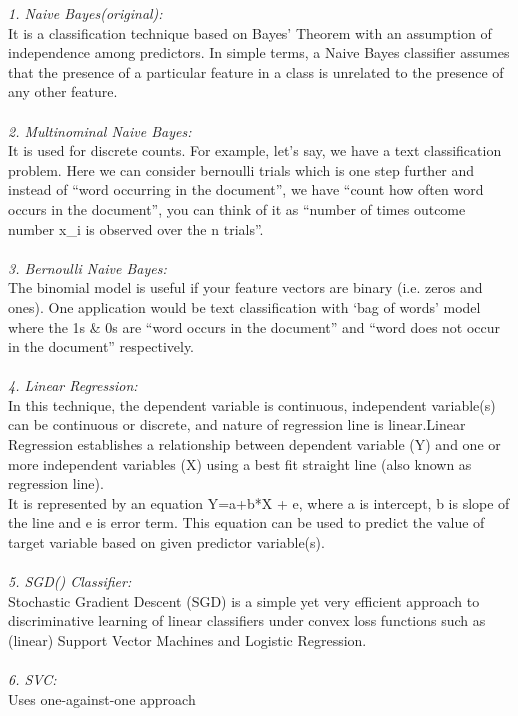 \documentclass[conference]{IEEEtran}
\begin{document}
{    \textit{1. Naive Bayes(original):} \\
	It is a classification technique based on Bayes’ Theorem with an assumption of independence among predictors. In simple terms, a Naive Bayes classifier assumes that the presence of a particular feature in a class is unrelated to the presence of any other feature.\\\\
    \textit{2. Multinominal Naive Bayes:}\\ 
	It is used for discrete counts. For example, let’s say,  we have a text classification problem. Here we can consider bernoulli trials which is one step further and instead of “word occurring in the document”, we have “count how often word occurs in the document”, you can think of it as “number of times outcome number x\_i is observed over the n trials”.\\\\
    \textit{3. Bernoulli Naive Bayes: }\\
	The binomial model is useful if your feature vectors are binary (i.e. zeros and ones). One application would be text classification with ‘bag of words’ model where the 1s \& 0s are “word occurs in the document” and “word does not occur in the document” respectively.\\\\
	\textit{4. Linear Regression:} \\
	In this technique, the dependent variable is continuous, independent variable(s) can be continuous or discrete, and nature of regression line is linear.Linear Regression establishes a relationship between dependent variable (Y) and one or more independent variables (X) using a best fit straight line (also known as regression line).\\
	It is represented by an equation Y=a+b*X + e, where a is intercept, b is slope of the line and e is error term. This equation can be used to predict the value of target variable based on given predictor variable(s).\\\\
	\textit{5. SGD() Classifier: }\\
	Stochastic Gradient Descent (SGD) is a simple yet very efficient approach to discriminative learning of linear classifiers under convex loss functions such as (linear) Support Vector Machines and Logistic Regression.\\\\
	\textit{6. SVC:} \\
	Uses one-against-one approach\\\\
}
\end{document}
